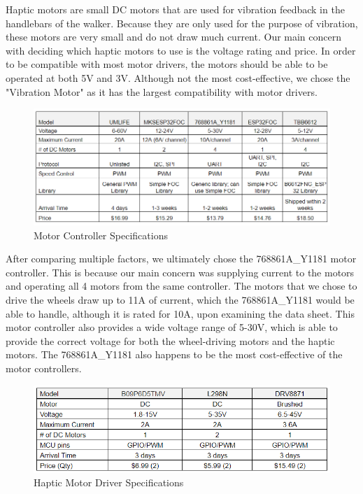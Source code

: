 \noindent Haptic motors are small DC motors that are used for vibration feedback in the handlebars of the walker. Because they are only used for the purpose of vibration, these motors are very small and do not draw much current. Our main concern with deciding which haptic motors to use is the voltage rating and price. In order to be compatible with most motor drivers, the motors should be able to be operated at both 5V and 3V. Although not the most cost-effective, we chose the "Vibration Motor" as it has the largest compatibility with motor drivers.\\

\begin{figure}[H]
	\centering
	\includegraphics[width=1\textwidth]{./Images/motor_controller_table2.png}
	\caption{\label{fig:motor_controller}Motor Controller Specifications}
\end{figure}

\noindent After comparing multiple factors, we ultimately chose the 768861A\_Y1181 motor controller. This is because our main concern was supplying current to the motors and operating all 4 motors from the same controller. The motors that we chose to drive the wheels draw up to 11A of current, which the 768861A\_Y1181 would be able to handle, although it is rated for 10A, upon examining the data sheet. This motor controller also provides a wide voltage range of 5-30V, which is able to provide the correct voltage for both the wheel-driving motors and the haptic motors. The 768861A\_Y1181 also happens to be the most cost-effective of the motor controllers. \cite{UMLIFE} \cite{AliExpress5} \cite{Makerbase} \cite{AliExpress7} \cite{CircuitBasics} \cite{Espressif1} \cite{AliExpress4} \cite{Burgess} \cite{RandomNerd} \cite{Espressif2} \cite{SimpleFOC} \cite{SimpleFOC2} \cite{Peza}\\


\begin{figure}[H]
	\centering
	\includegraphics[width=1\textwidth]{./Images/haptic_driver_table_2.png}
	\caption{\label{fig:haptic_driver}Haptic Motor Driver Specifications}
\end{figure}

